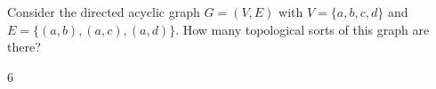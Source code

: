 \begin{prob}
    Consider the directed acyclic graph $G = (V, E)$ with $V = \{a, b, c, d\}$
    and $E = \{(a, b), (a,c), (a,d)\}$. How many topological sorts of this
    graph are there?

    \begin{soln}
        6
    \end{soln}
\end{prob}
